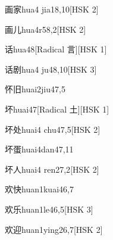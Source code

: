 \begin{entry}{画家}{hua4 jia1}{8,10}[HSK 2]
\end{entry}

\begin{entry}{画儿}{hua4r5}{8,2}[HSK 2]
\end{entry}

\begin{entry}{话}{hua4}{8}[Radical 言][HSK 1]
\end{entry}

\begin{entry}{话剧}{hua4 ju4}{8,10}[HSK 3]
\end{entry}

\begin{entry}{怀旧}{huai2jiu4}{7,5}
\end{entry}

\begin{entry}{坏}{huai4}{7}[Radical 土][HSK 1]
\end{entry}

\begin{entry}{坏处}{huai4 chu4}{7,5}[HSK 2]
\end{entry}

\begin{entry}{坏蛋}{huai4dan4}{7,11}
\end{entry}

\begin{entry}{坏人}{huai4 ren2}{7,2}[HSK 2]
\end{entry}

\begin{entry}{欢快}{huan1kuai4}{6,7}
\end{entry}

\begin{entry}{欢乐}{huan1le4}{6,5}[HSK 3]
\end{entry}

\begin{entry}{欢迎}{huan1ying2}{6,7}[HSK 2]
\end{entry}

